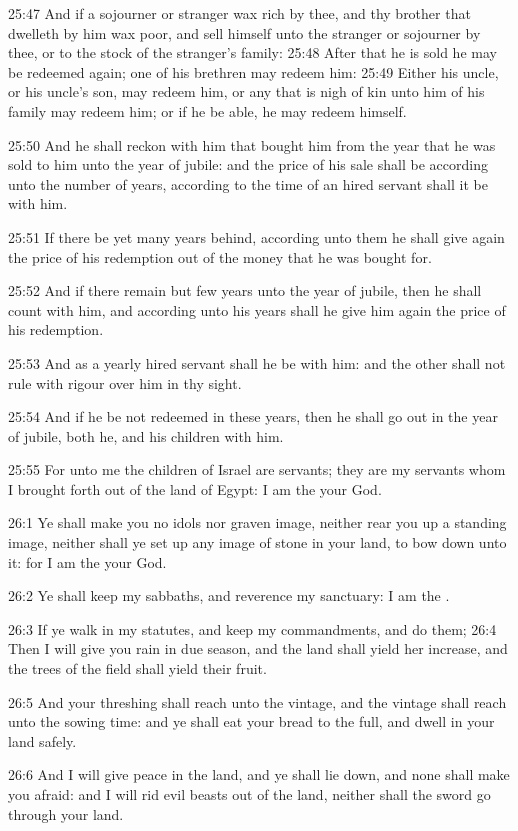 25:47 And if a sojourner or stranger wax rich by thee, and thy brother
that dwelleth by him wax poor, and sell himself unto the stranger or
sojourner by thee, or to the stock of the stranger's family: 25:48
After that he is sold he may be redeemed again; one of his brethren
may redeem him: 25:49 Either his uncle, or his uncle's son, may redeem
him, or any that is nigh of kin unto him of his family may redeem him;
or if he be able, he may redeem himself.

25:50 And he shall reckon with him that bought him from the year that
he was sold to him unto the year of jubile: and the price of his sale
shall be according unto the number of years, according to the time of
an hired servant shall it be with him.

25:51 If there be yet many years behind, according unto them he shall
give again the price of his redemption out of the money that he was
bought for.

25:52 And if there remain but few years unto the year of jubile, then
he shall count with him, and according unto his years shall he give
him again the price of his redemption.

25:53 And as a yearly hired servant shall he be with him: and the
other shall not rule with rigour over him in thy sight.

25:54 And if he be not redeemed in these years, then he shall go out
in the year of jubile, both he, and his children with him.

25:55 For unto me the children of Israel are servants; they are my
servants whom I brought forth out of the land of Egypt: I am the \LORD
your God.

26:1 Ye shall make you no idols nor graven image, neither rear you up
a standing image, neither shall ye set up any image of stone in your
land, to bow down unto it: for I am the \LORD your God.

26:2 Ye shall keep my sabbaths, and reverence my sanctuary: I am the
\LORD.

26:3 If ye walk in my statutes, and keep my commandments, and do them;
26:4 Then I will give you rain in due season, and the land shall yield
her increase, and the trees of the field shall yield their fruit.

26:5 And your threshing shall reach unto the vintage, and the vintage
shall reach unto the sowing time: and ye shall eat your bread to the
full, and dwell in your land safely.

26:6 And I will give peace in the land, and ye shall lie down, and
none shall make you afraid: and I will rid evil beasts out of the
land, neither shall the sword go through your land.

